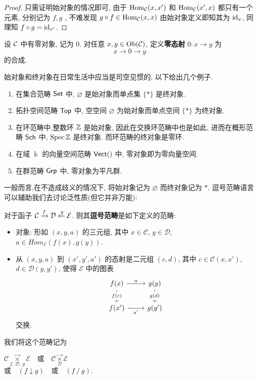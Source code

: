 \begin{proof}
    只需证明始对象的情况即可, 由于 $\operatorname{Hom}_{\cal{C}}(x,x')$ 和 $\operatorname{Hom}_{\cal{C}}(x',x)$ 都只有一个元素, 分别记为 $f,g$ , 不难发现 $g\circ f \in \operatorname{Hom}_{\cal{C}}(x,x)$ 由始对象定义即知其为 $\mathrm{id}_x$, 同理知 $f\circ g = \mathrm{id}_{x'}$.
\end{proof}
\begin{definition}[零态射]
    设 $\cal{C}$ 中有零对象, 记为 $0$. 对任意 $x,y \in \operatorname{Ob}(\cal{C})$, 定义\textbf{零态射} $0: x \to y$ 为
    \[
    x \to 0\to y
    \]
    的合成.
\end{definition}
始对象和终对象在日常生活中应当是司空见惯的, 以下给出几个例子.
\begin{example}
    \begin{enumerate}
        \item 在集合范畴 $\mathsf{Set}$ 中, $\varnothing$ 是始对象而单点集 $\{*\}$ 是终对象.
        \item 拓扑空间范畴 $\mathsf{Top}$ 中, 空空间 $\varnothing$ 为始对象而单点空间 $\{*\}$ 为终对象.
        \item 在环范畴中,整数环 $\mathbb{Z}$ 是始对象, 因此在交换环范畴中也是如此, 进而在概形范畴 $\mathsf{Sch}$ 中, $\operatorname{Spec} \mathbb{Z}$ 是终对象. 而环范畴的终对象是零环.
        \item 在域 $\Bbbk$ 的向量空间范畴 $\mathsf{Vect}(\relax)$ 中, 零对象即为零向量空间.
        \item 在群范畴 $\mathsf{Grp}$ 中, 零对象为平凡群.
    \end{enumerate}
\end{example}
一般而言,在不造成歧义的情况下, 将始对象记为 $\varnothing$ 而终对象记为 $*$.
逗号范畴语言可以辅助我们去讨论泛性质(但它并非万能):
\begin{definition}[逗号范畴]
    对于函子 $\mathcal{C}\xrightarrow{f}\mathcal{D}\xleftarrow{g}\cal{E}$.
    则其\textbf{逗号范畴}是如下定义的范畴:
    \begin{itemize}
        \item 对象: 形如 $(x, y, a)$ 的三元组,
        其中 $x \in \mathcal{C}$, $y \in \mathcal{D}$,
        $a \in Hom_{\mathcal{E}} (f (x), g (y))$.
        \item 从 $(x, y, a)$ 到 $(x', y', a')$ 的态射是二元组 $(c, d)$,
        其中 $c \in \mathcal{C} (x, x')$, $d \in \mathcal{D} (y, y')$,
        使得 $\mathcal{E}$ 中的图表
        \[\begin{tikzcd}
	{f(x)} & {g(y)} \\
	{f(x')} & {g(y')}
	\arrow["a", from=1-1, to=1-2]
	\arrow["{f(c)}"{description}, from=1-1, to=2-1]
	\arrow["{g(d)}"{description}, from=1-2, to=2-2]
	\arrow["{a'}"', from=2-1, to=2-2]
       \end{tikzcd}\]
        交换.
    \end{itemize}

    我们将这个范畴记为
    \begin{center}
        $\mathcal{C} \underset{f, \, \mathcal{D}, \, g}{\vec{\times}}
        \mathcal{E} \quad \text{或} \quad
        \mathcal{C} \mathbin{\underset{\mathcal{D}}{\vec{\times}}}
        \mathcal{E}$ \\ $\text{或} \quad
        (f \downarrow g) \quad \text{或} \quad (f \mathbin{/} g) .$
    \end{center}
\end{definition}

